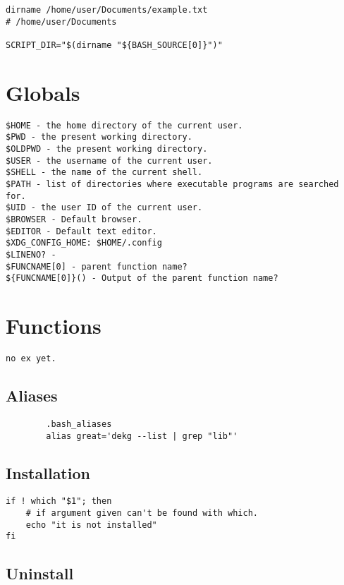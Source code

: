 \begin{verbatim}
dirname /home/user/Documents/example.txt
# /home/user/Documents

SCRIPT_DIR="$(dirname "${BASH_SOURCE[0]}")"
\end{verbatim}

\section{Globals}
\begin{verbatim}
$HOME - the home directory of the current user.
$PWD - the present working directory.
$OLDPWD - the present working directory.
$USER - the username of the current user.
$SHELL - the name of the current shell.
$PATH - list of directories where executable programs are searched for.
$UID - the user ID of the current user.
$BROWSER - Default browser.
$EDITOR - Default text editor.
$XDG_CONFIG_HOME: $HOME/.config
$LINENO? -
$FUNCNAME[0] - parent function name?
${FUNCNAME[0]}() - Output of the parent function name?
\end{verbatim}

\section{Functions}

\begin{verbatim}
no ex yet.
\end{verbatim}

\subsection{Aliases}

\begin{verbatim}
        .bash_aliases
        alias great='dekg --list | grep "lib"'
\end{verbatim}

\subsection{Installation}

\begin{verbatim}
if ! which "$1"; then
    # if argument given can't be found with which. 
    echo "it is not installed"
fi
\end{verbatim}

\subsection{Uninstall}


